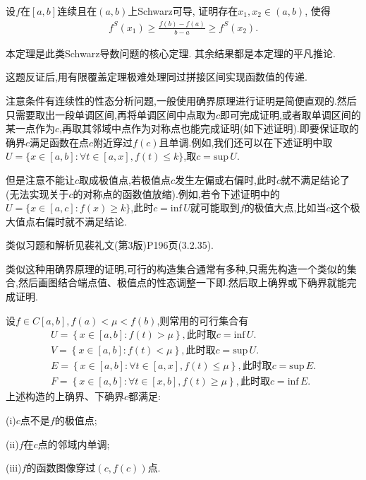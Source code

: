 \documentclass[../../main.tex]{subfiles}%
\begin{document}
\begin{theorem}[Schwarz导数的Lagrange中值定理]\label{theorem:Schwarz导数的Lagrange中值定理}
设$f$在$[a,b]$连续且在$(a,b)$上Schwarz可导, 证明存在$x_1,x_2 \in (a,b)$, 使得
\begin{align}
f^S(x_1) \geqslant \frac{f(b) - f(a)}{b - a} \geqslant f^S(x_2). \label{eq:13.2348982334242te3fd938523i23903t3ger34t4234898938523i23903t3ger34t4107}
\end{align}
\end{theorem}
\begin{note}
本定理是此类Schwarz导数问题的核心定理. 其余结果都是本定理的平凡推论.
\end{note}
\begin{remark}
这题反证后,用有限覆盖定理极难处理同过拼接区间实现函数值的传递.

注意条件有连续性的性态分析问题,一般使用确界原理进行证明是简便直观的.然后只需要取出一段单调区间,再将单调区间中点取为$c$即可完成证明,或者取单调区间的某一点作为$c$,再取其邻域中点作为对称点也能完成证明(如下述证明).即要保证取的确界$c$满足函数在点$c$附近穿过$f(c)$且单调.例如,我们还可以在下述证明中取$U=\{x\in [a,b]:\forall t\in [a,x],f(t)\leqslant k\}$,取$c=\mathrm{sup}\,U$.

但是注意不能让$c$取成极值点,若极值点$c$发生左偏或右偏时,此时$c$就不满足结论了(无法实现关于$c$的对称点的函数值放缩).例如,若令下述证明中的$U=\{x\in [a,c]:f(x)\geqslant k\}$,此时$c=\mathrm{inf}\, U$就可能取到$f$的极值大点,比如当$c$这个极大值点右偏时就不满足结论.

类似习题和解析见裴礼文(第3版)P196页(3.2.35).
\end{remark}
\begin{note}
类似这种用确界原理的证明,可行的构造集合通常有多种,只需先构造一个类似的集合,然后画图结合端点值、极值点的性态调整一下即.然后取上确界或下确界就能完成证明.

设$f\in C[a,b],f(a)<\mu <f(b)$,则常用的可行集合有
\begin{gather*}
U=\left\{ x\in \left[ a,b \right] :f\left( t \right) >\mu \right\} ,\text{此时取}c=\mathrm{inf}\,U.
\\
V=\left\{ x\in \left[ a,b \right] :f\left( t \right) <\mu \right\} ,\text{此时取}c=\mathrm{sup}\,U.
\\
E=\left\{ x\in \left[ a,b \right] :\forall t\in \left[ a,x \right] ,f\left( t \right) \leqslant \mu \right\} ,\text{此时取}c=\mathrm{sup}\,E.
\\
F=\left\{ x\in \left[ a,b \right] :\forall t\in \left[ x,b \right] ,f\left( t \right) \geqslant \mu \right\} ,\text{此时取}c=\mathrm{inf}\,E.
\end{gather*}
上述构造的上确界、下确界$c$都满足:

(i)$c$点不是$f$的极值点;

(ii)$f$在$c$点的邻域内单调;

(iii)$f$的函数图像穿过$(c,f(c))$点.
\end{note}
\end{document}
